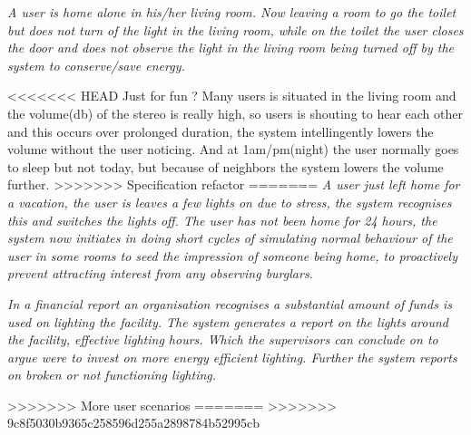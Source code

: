 \textit{A user is home alone in his/her living room. Now leaving a room to go the toilet but does not turn of the light in the living room, while on the toilet the user closes the door and does not observe the light in the living room being turned off by the system to conserve/save energy.}

<<<<<<< HEAD
Just for fun ? Many users is situated in the living room and the volume(db) of the stereo is really high, so users is shouting to hear each other and this occurs over prolonged duration, the system intellingently lowers the volume without the user noticing. And at 1am/pm(night) the user normally goes to sleep but not today, but because of neighbors the system lowers the volume further.
>>>>>>> Specification refactor
=======
\textit{A user just left home for a vacation, the user is leaves a few lights on due to stress, the system recognises this and switches the lights off. The user has not been home for 24 hours, the system now initiates in doing short cycles of simulating normal behaviour of the user in some rooms to seed the impression of someone being home, to proactively prevent attracting interest from any observing burglars.}

\textit{In a financial report an organisation recognises a substantial amount of funds is used on lighting the facility. The system generates a report on the lights around the facility, effective lighting hours. Which the supervisors can conclude on to argue were to invest on more energy efficient lighting. Further the system reports on broken or not functioning lighting.}


>>>>>>> More user scenarios
=======
>>>>>>> 9c8f5030b9365c258596d255a2898784b52995cb

